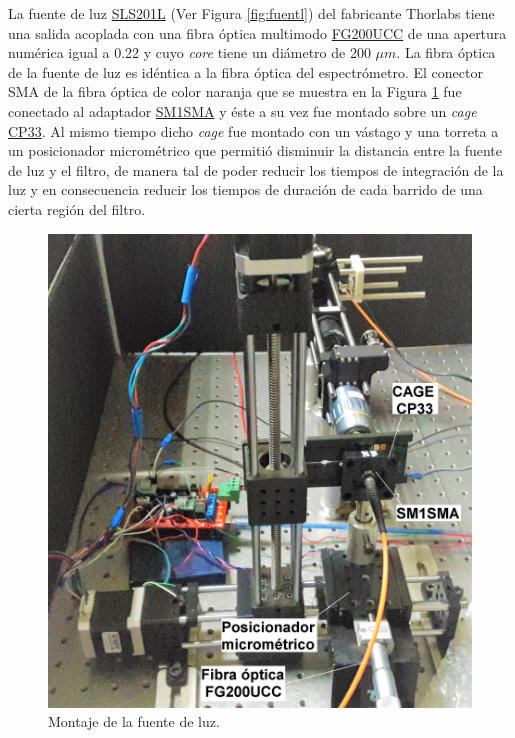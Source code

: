  La fuente de luz \href{https://www.thorlabs.com/newgrouppage9.cfm?objectgroup_id=7269&pn=SLS201L/M}{SLS201L} (Ver Figura \ref{fig:fuentl}) del fabricante Thorlabs tiene una salida acoplada con una fibra óptica multimodo \href{https://www.thorlabs.com/newgrouppage9.cfm?objectgroup_id=6839&pn=FG200UCC}{FG200UCC} de una apertura numérica igual a 0.22 y cuyo \textit{core} tiene un diámetro de 200 $\mu m$. La fibra óptica de la fuente de luz es idéntica a la fibra óptica del espectrómetro. El conector SMA de la fibra óptica de color naranja que se muestra en la Figura \ref{fig:montttluz} fue conectado al adaptador \href{https://www.thorlabs.com/thorproduct.cfm?partnumber=SM1SMA\#ad-image-0}{SM1SMA} y éste a su vez fue montado sobre un \textit{cage} \href{https://www.thorlabs.com/thorproduct.cfm?partnumber=CP33}{CP33}. Al mismo tiempo dicho \textit{cage} fue montado con un vástago y una torreta a un posicionador micrométrico que permitió disminuir la distancia entre la fuente de luz y el filtro, de manera tal de poder reducir los tiempos de integración de la luz y en consecuencia reducir los tiempos de duración de cada barrido de una cierta región del filtro.
\begin{figure}[H]
	\centering
	\includegraphics[scale=0.15]{Figs/microespectrometro/setupactualdecote_retoc_condetalles.jpg}
	\caption{Montaje de la fuente de luz.}
	\label{fig:montttluz}
\end{figure}
 
